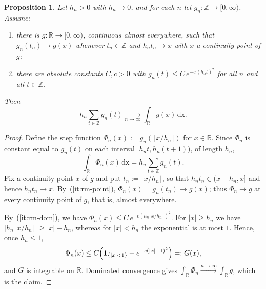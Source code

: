 \documentclass[english,11pt]{smfart}
\newcommand{\ndZ}{\mathbb{Z}}
\newcommand{\ndR}{\mathbb{R}}
\newtheorem{proposition}[theorem]{Proposition}
\numberwithin{equation}{section}
\begin{document}
\begin{proposition}
	\label{prop:riemann}
	Let $h_n>0$ with $h_n\to0$, and for each $n$ let $g_n:\ndZ\to[0,\infty)$. Assume:
	\begin{enumerate}
		\item\label{it:rm-point} there is $g:\ndR\to[0,\infty)$, continuous almost everywhere, such that $g_n(t_n)\to g(x)$ whenever $t_n\in\ndZ$ and $h_n t_n\to x$ with $x$ a continuity point of $g$;
		\item\label{it:rm-dom} there are absolute constants $C,c>0$ with $g_n(t)\le C\,e^{-c\,(h_n t)^2}$ for all $n$ and all $t\in\ndZ$.
	\end{enumerate}
	Then
	\[
		h_n\sum_{t\in\ndZ}g_n(t)\xrightarrow[n\to\infty]{}\int_{\ndR}g(x)\,\mathrm{dx} .
	\]
\end{proposition}
\begin{proof}
	Define the step function $\Phi_n(x):=g_n(\lfloor x/h_n\rfloor)$ for $x\in\ndR$. Since $\Phi_n$ is constant equal to $g_n(t)$ on each interval $[h_n t,h_n(t+1))$, of length $h_n$,
	\[
		\int_{\ndR}\Phi_n(x)\, \mathrm{dx}=h_n\sum_{t\in\ndZ}g_n(t).
	\]
	Fix a continuity point $x$ of $g$ and put $t_n:=\lfloor x/h_n\rfloor$, so that $h_n t_n\in(x-h_n,x]$ and hence $h_n t_n\to x$. By~(\ref{it:rm-point}), $\Phi_n(x)=g_n(t_n)\to g(x)$; thus $\Phi_n\to g$ at every continuity point of $g$, that is, almost everywhere.
\medskip
    
	By~(\ref{it:rm-dom}), we have $\Phi_n(x)\le C\,e^{-c(h_n\lfloor x/h_n\rfloor)^2}$. For $|x|\ge h_n$ we have $|h_n\lfloor x/h_n\rfloor|\ge|x|-h_n$, whereas for $|x|<h_n$ the exponential is at most $1$. Hence, once $h_n\le1$,
	\[
		\Phi_n(x)\le C\Bigl(\mathbf 1_{\{|x|<1\}}+e^{-c(|x|-1)^2}\Bigr)=: G(x),
	\]
	and $G$ is integrable on $\ndR$. Dominated convergence gives $\int_{\ndR}\Phi_n\stackrel{n \rightarrow \infty}{\longrightarrow}\int_{\ndR} g$, which is the claim.
\end{proof}
\end{document}
